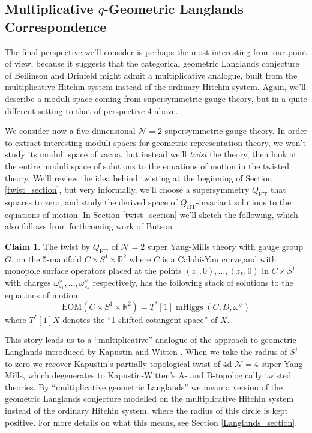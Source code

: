 \documentclass[11pt, oneside, reqno]{amsart}
\theoremstyle{definition} \newtheorem{definition}{Definition}[section]
\newtheorem{claimnum}[definition]{Claim}
\theoremstyle{definition} \newtheorem{remark}[definition]{Remark}
\theoremstyle{definition} \newtheorem{remarks}[definition]{Remarks}
\theoremstyle{definition} \newtheorem{question}[definition]{Question}
\theoremstyle{definition} \newtheorem*{note}{Note}
\theoremstyle{definition} \newtheorem{example}[definition]{Example}
\theoremstyle{definition} \newtheorem{examples}[definition]{Examples}
\newcommand{\mr}[1]{\mathrm{#1}}
\newcommand{\mc}[1]{\mathcal{#1}}
\newcommand{\RR}{\mathbb{R}}
\DeclareMathOperator{\mhiggs}{mHiggs}
\newcommand{\HT}{\mr{HT}}
\begin{document}
\subsection{Multiplicative $q$-Geometric Langlands Correspondence}
The final perspective we'll consider is perhaps the most interesting from our point of view, because it suggests that the categorical geometric Langlands conjecture of Beilinson and Drinfeld might admit a multiplicative analogue, built from the multiplicative Hitchin system instead of the ordinary Hitchin system.  Again, we'll describe a moduli space coming from supersymmetric gauge theory, but in a quite different setting to that of perspective 4 above.

We consider now a five-dimensional $\mc N=2$ supersymmetric gauge theory.  In order to extract interesting moduli spaces for geometric representation theory, we won't study its moduli space of vacua, but instead we'll \emph{twist} the theory, then look at the entire moduli space of solutions to the equations of motion in the twisted theory.  We'll review the idea behind twisting at the beginning of Section \ref{twist_section}, but very informally, we'll choose a supersymmetry $Q_\HT$ that squares to zero, and study the derived space of $Q_\HT$-invariant solutions to the equations of motion.  In Section \ref{twist_section} we'll sketch the following, which also follows from forthcoming work of Butson \cite{Butson}.

\begin{claimnum}
The twist by $Q_\HT$ of $\mc N=2$ super Yang-Mills theory with gauge group $G$, on the 5-manifold $C \times S^1 \times \RR^2$ where $C$ is a Calabi-Yau curve,and  with monopole surface operators placed at the points $(z_1,0), \ldots, (z_k,0)$ in $C \times S^1$ with charges $\omega^\vee_{z_1}, \ldots, \omega^\vee_{z_k}$ respectively, has the following stack of solutions to the equations of motion:
\[\mr{EOM}(C \times S^1 \times \RR^2) = T^*[1]\mhiggs(C,D,\omega^\vee)\]
where $T^*[1]X$ denotes the ``1-shifted cotangent space'' of $X$.
\end{claimnum}

This story leads us to a ``multiplicative'' analogue of the approach to geometric Langlands introduced by Kapustin and Witten \cite{KapustinWitten}.  When we take the radius of $S^1$ to zero we recover Kapustin's partially topological twist \cite{KapustinHolo} of 4d $\mc N=4$ super Yang-Mills, which degenerates to Kapustin-Witten's A- and B-topologically twisted theories.  By ``multiplicative geometric Langlands'' we mean a version of the geometric Langlands conjecture modelled on the multiplicative Hitchin system instead of the ordinary Hitchin system, where the radius of this circle is kept positive.  For more details on what this means, see Section \ref{Langlands_section}.
\end{document}
